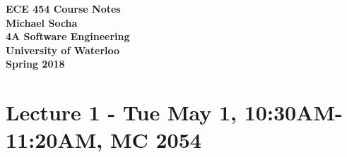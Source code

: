 \documentclass[12pt,titlepage]{article}
\begin{document}
  \begin{titlepage}
    \vspace*{\fill}
    \centering

    \textbf{\Huge ECE 454 Course Notes} \\ [1em]
    \textbf{\Large Michael Socha} \\ [1em]
    \textbf{\large 4A Software Engineering} \\
    \textbf{\large University of Waterloo} \\
    \textbf{\large Spring 2018} \\
    \vspace*{\fill}
  \end{titlepage}

  \newpage 

  \tableofcontents

  \newpage

  \section{Lecture 1 - Tue May 1, 10:30AM-11:20AM, MC 2054}
\end{document}
